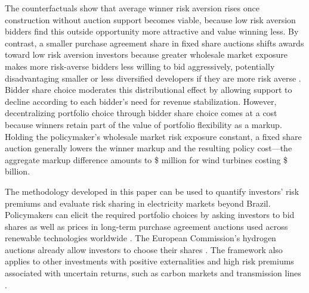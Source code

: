 \documentclass[12pt]{article}
\theoremstyle{definition} %
\begin{document}
The counterfactuals show that average winner risk aversion rises once construction without auction support becomes viable, because low risk aversion bidders find this outside opportunity more attractive and value winning less. By contrast, a smaller purchase agreement share in fixed share auctions shifts awards toward low risk aversion investors because greater wholesale market exposure makes more risk-averse bidders less willing to bid aggressively, potentially disadvantaging smaller or less diversified developers if they are more risk averse \citep*{Herranz2015}. Bidder share choice moderates this distributional effect by allowing support to decline according to each bidder's need for revenue stabilization. However, decentralizing portfolio choice through bidder share choice comes at a cost because winners retain part of the value of portfolio flexibility as a markup. Holding the policymaker's wholesale market risk exposure constant, a fixed share auction generally lowers the winner markup and the resulting policy cost---the aggregate markup difference amounts to \$ million for wind turbines costing \$ billion.

The methodology developed in this paper can be used to quantify investors' risk premiums and evaluate risk sharing in electricity markets beyond Brazil. Policymakers can elicit the required portfolio choices by asking investors to bid shares as well as prices in long-term purchase agreement auctions used across renewable technologies worldwide \citep{IRENA2019,IRENA2024a}. The European Commission's hydrogen auctions already allow investors to choose their shares \citep{EuropeanCommission2024}. The framework also applies to other investments with positive externalities and high risk premiums associated with uncertain returns, such as carbon markets and transmission lines \citep{FederalGovernmentofGermany2023,DOE2023}.


\end{document}
